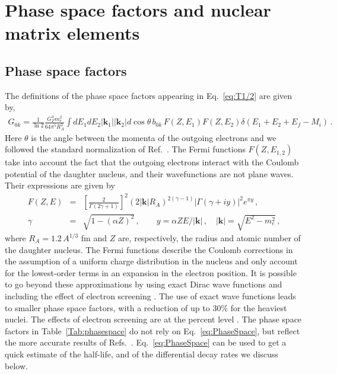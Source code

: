 \documentclass[letterpaper,11pt]{article}
\newcommand{\al}{\alpha}
\newcommand{\g}{\gamma}
\newcommand{\dt}{\delta}
\newcommand{\bea}{\begin{eqnarray}}
\newcommand{\eea}{\end{eqnarray}}
\renewcommand{\vec}[1]{{\mathbf #1}}
\newcommand{\sq}{^{2}}
\newcommand{\nn}{\nonumber}
\begin{document}
\newpage

\appendix
\section{Phase space factors and nuclear matrix elements}\label{sec:app}


\subsection{Phase space factors}\label{Phase}
The definitions of the phase space factors appearing in Eq.\ \eqref{eq:T1/2} are given by,
\bea\label{eq:PhaseSpace}
G_{0k}=\frac{1}{\ln 2}\frac{G_F^4m_e\sq}{64\pi^5 R_A\sq}\int  dE_1 dE_2 |\vec k_1| |\vec k_2| d\cos\theta \,b_{0k} \,F(Z,E_1)F(Z,E_2) \dt(E_1+E_2+E_f-M_i)\,.
\eea
Here $\theta$ is the angle between the momenta of the outgoing electrons and we followed the standard normalization of Ref.~\cite{Doi:1985dx}. 
The Fermi functions $F(Z,E_{1,2})$ take into account the fact that the outgoing electrons interact with the Coulomb potential of the daughter nucleus, 
and their wavefunctions are not plane waves. Their expressions are given by
\bea \label{fermi}
F(Z,E) &=& \left[\frac{2}{\Gamma(2\g+1)}\right]\sq (2|\vec k|R_A)^{2(\g-1)}|\Gamma(\g+i y)|\sq e^{\pi y}\,,\nn\\
\g &=&\sqrt{1-(\al Z)\sq}\,,\qquad y = \al Z E/|\vec k|\,,\quad |\vec k | = \sqrt{E^2-m_e\sq}\,,
\eea
where $R_A = 1.2 \,A^{1/3}$ fm and $Z$ are, respectively, the radius and atomic number of the daughter nucleus. 
The Fermi functions describe the  Coulomb corrections in the assumption of a uniform charge distribution in the nucleus and only account for the lowest-order terms in an  expansion in the electron position. 
It is possible to go beyond these approximations by using exact Dirac wave functions \cite{Stefanik:2015twa} and including the effect of electron screening \cite{Kotila:2012zza}. The use of exact wave functions leads to  smaller phase space factors, with a reduction of  up to $30\%$ for the heaviest nuclei. The effects of electron screening are at the percent level \cite{Stefanik:2015twa}. 
The phase space factors in Table~\ref{Tab:phasespace} do not rely on Eq.\ \eqref{eq:PhaseSpace}, but reflect the more accurate results of Refs.~\cite{Horoi:2017gmj,Stefanik:2015twa}.  
Eq.\ \eqref{eq:PhaseSpace} can be used to get a quick estimate of the half-life, and of the differential decay rates we discuss below. 
\end{document}
